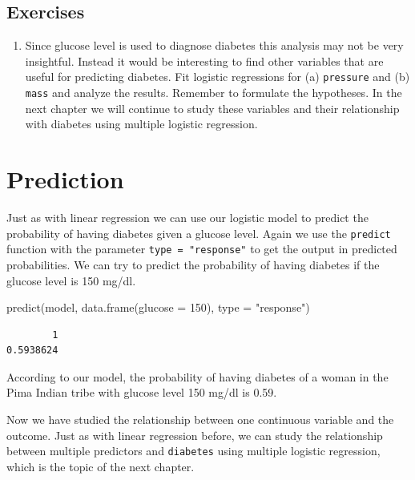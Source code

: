 \documentclass[
  letterpaper,
  DIV=11,
  numbers=noendperiod]{scrreprt}
\newenvironment{Shaded}{\begin{snugshade}}{\end{snugshade}}
\newcommand{\AttributeTok}[1]{\textcolor[rgb]{0.40,0.45,0.13}{#1}}
\newcommand{\DecValTok}[1]{\textcolor[rgb]{0.68,0.00,0.00}{#1}}
\newcommand{\FunctionTok}[1]{\textcolor[rgb]{0.28,0.35,0.67}{#1}}
\newcommand{\NormalTok}[1]{\textcolor[rgb]{0.00,0.23,0.31}{#1}}
\newcommand{\StringTok}[1]{\textcolor[rgb]{0.13,0.47,0.30}{#1}}
\providecommand{\tightlist}{%
  \setlength{\itemsep}{0pt}\setlength{\parskip}{0pt}}\usepackage{longtable,booktabs,array}
\begin{document}
\subsection{Exercises}\label{exercises-24}

\begin{enumerate}
\def\labelenumi{\arabic{enumi}.}
\tightlist
\item
  Since glucose level is used to diagnose diabetes this analysis may not
  be very insightful. Instead it would be interesting to find other
  variables that are useful for predicting diabetes. Fit logistic
  regressions for (a) \texttt{pressure} and (b) \texttt{mass} and
  analyze the results. Remember to formulate the hypotheses. In the next
  chapter we will continue to study these variables and their
  relationship with diabetes using multiple logistic regression.
\end{enumerate}

\section{Prediction}\label{prediction-1}

Just as with linear regression we can use our logistic model to predict
the probability of having diabetes given a glucose level. Again we use
the \texttt{predict} function with the parameter
\texttt{type\ =\ "response"} to get the output in predicted
probabilities. We can try to predict the probability of having diabetes
if the glucose level is 150 mg/dl.

\begin{Shaded}
\begin{Highlighting}[]
\FunctionTok{predict}\NormalTok{(model, }\FunctionTok{data.frame}\NormalTok{(}\AttributeTok{glucose =} \DecValTok{150}\NormalTok{), }\AttributeTok{type =} \StringTok{"response"}\NormalTok{)}
\end{Highlighting}
\end{Shaded}

\begin{verbatim}
        1 
0.5938624 
\end{verbatim}

According to our model, the probability of having diabetes of a woman in
the Pima Indian tribe with glucose level 150 mg/dl is 0.59.

Now we have studied the relationship between one continuous variable and
the outcome. Just as with linear regression before, we can study the
relationship between multiple predictors and \texttt{diabetes} using
multiple logistic regression, which is the topic of the next chapter.
\end{document}
